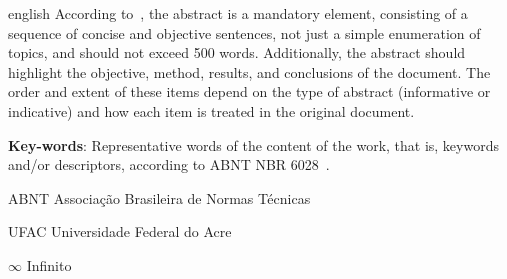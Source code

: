 \documentclass[
	12pt,				    %
	openright,			    %
	oneside,			    %
	a4paper,			    %
    sumario=tradicional,        %
	english,			    %
	brazil,				    %
 ]{abntex2}
\begin{document}
\begin{resumo}[Abstract]
    \begin{otherlanguage*}{english}
        \noindent
        According to~\cite{NBR6028:2003}, the abstract is a mandatory element, consisting of a sequence of concise and objective sentences, not just a simple enumeration of topics, and should not exceed 500 words. Additionally, the abstract should highlight the objective, method, results, and conclusions of the document. The order and extent of these items depend on the type of abstract (informative or indicative) and how each item is treated in the original document.
        \vspace{\onelineskip}

        \noindent
        \textbf{Key-words}: Representative words of the content of the work, that is, keywords and/or descriptors, according to ABNT NBR 6028~\cite{NBR6028:2003}.
    \end{otherlanguage*}
\end{resumo}

\listoffigures*
\cleardoublepage

\listoftables*
\cleardoublepage


\begin{siglas}
    \item[ABNT] Associação Brasileira de Normas Técnicas
    \item[UFAC] Universidade Federal do Acre
\end{siglas}


\begin{simbolos}
\item[$\infty$ ] Infinito
\end{simbolos}


\tableofcontents*
\cleardoublepage


\textual
\end{document}
